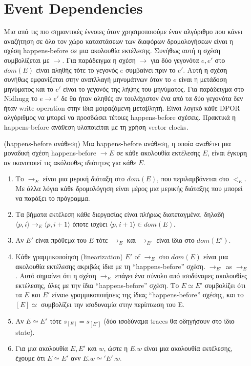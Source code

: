 \section{Event Dependencies}

Μια από τις πιο σημαντικές έννοιες όταν χρησιμοποιούμε έναν αλγόριθμο που κάνει αναζήτηση σε όλο τον χώρο καταστάσεων των διαφόρων δρομολογήσεων είναι η σχέση
happens-before σε μια ακολουθία εκτέλεσης. Συνήθως αυτή η σχέση συμβολίζεται με $\rightarrow$. Για παράδειγμα η σχέση $\rightarrow$ 
για δύο γεγονότα $e,e'$ στο $dom(E)$ είναι αληθής τότε το γεγονός $e$ συμβαίνει πριν το $e'$. Αυτή η σχέση συνήθως εμφανίζεται στην ανατλλαγή μηνυμάτνων όταν το  $e$ 
είναι η μετάδοση μηνύματος και το $e'$ είναι το γεγονός της λήψης του μηνύματος. Για παράδειγμα στο Nidhugg το $e \rightarrow e'$ δε θα ήταν αληθές αν τουλάχιστον ένα από τα δύο γεγονότα
δεν ήταν write operation στην ίδια μοιραζόμενη μεταβλητή. Είναι λογικό κάθε DPOR αλγόριθμος να μπορεί να προσδώσει τέτοιες happens-before σχέσεις. 
Πρακτικά η happens-before ανάθεση υλοποιείται με τη χρήση vector clocks.

\begin{definition}{(happens-before ανάθεση)}
    Μια happens-before ανάθεση, η οποία αναθέτει μια μοναδική σχέση
    happens-before $\rightarrow E$ σε κάθε ακολουθία εκτέλεσης
    $E$, είναι έγκυρη αν ικανοποιεί τις ακόλουθες ιδιότητες για κάθε $E$.
    \begin{enumerate}
        \item Το $\rightarrow_{E}$ είναι μια μερική διάταξη στο $dom(E)$, που περιλαμβάνεται στο $<_E$. Με άλλα λόγια κάθε δρομολόγηση είναι μέρος μια μερικής διάταξης που μπορεί να παράξει το πρόγραμμα.
        \item Τα βήματα εκτέλεση κάθε διεργασίας είναι πλήρως διατεταγμένα, δηλαδή
        $\langle p,i \rangle \rightarrow_E \langle p,i+1 \rangle$ όποτε ισχύει $\langle p, i+1 \rangle \in dom(E)$.
        \item Αν $E'$ είναι πρόθεμα του $E$ τότε $\rightarrow_E$ και $\rightarrow_{E'}$ είναι ίδια στο $dom(E')$.
        \item Κάθε γραμμικοποίηση (linearization) $E'$ of $\rightarrow_E$ στο $dom(E)$ είναι μια ακολουθία εκτέλεσης ακριβώς ίδια με τη “happens-before” σχέση.
$\rightarrow_{E'}$ as $\rightarrow_E$. Αυτό σημαίνει ότι η σχέση $\rightarrow_E$ επάγει ένα σύνολο
από ισοδύναμες ακολουθίες εκτέλεσης, όλες με την ίδια “happens-before” σχέση. 
Το $E \simeq E'$ συμβολίζει ότι τα $E$ και $E'$ είναιe
γραμμικοποιήσεις της ίδιας “happens-before” σχέσης, και το $[E] \simeq$ 
συμβολίζει την ισοδυναμία στην περίπτωση του E.
    \item Αν $E \simeq E'$ τότε $s_{[E]} = s_{[E']}$ (δύο ισοδύναμα traces θα οδηγήσουν στο ίδιο state).
    \item Για μια ακολουθία $E, E'$ και $w$, ώστε η $E.w$  είναι μια ακολουθία εκτέλεσης, έχουμε ότι $E \simeq E'$  ανν $E.w \simeq' E'.w$.
    \end{enumerate}
\end{definition}

